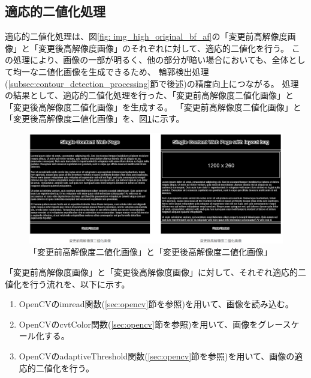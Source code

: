 \subsection{適応的二値化処理}\label{subsec:Adaptive_Binarisation}
適応的二値化処理は、図\ref{fig: img_high_original_bf_af}の「変更前高解像度画像」と「変更後高解像度画像」のそれぞれに対して、適応的二値化を行う。
この処理により、画像の一部が明るく、他の部分が暗い場合においても、全体として均一な二値化画像を生成できるため、
輪郭検出処理(\ref{subsec:contour_detection_processing}節で後述)の精度向上につながる。
処理の結果として、適応的二値化処理を行った、「変更前高解像度二値化画像」と「変更後高解像度二値化画像」を生成する。
「変更前高解像度二値化画像」と「変更後高解像度二値化画像」を、図\ref{fig: img_high_bin_bf_af}に示す。
\begin{figure}[tp]
    \begin{center}
        \includegraphics[width=1.0\columnwidth]{image/4_img_high_bin_bf_af.png}
        \caption{「変更前高解像度二値化画像」と「変更後高解像度二値化画像」}
        \label{fig: img_high_bin_bf_af}
    \end{center}
\end{figure}
\par
「変更前高解像度画像」と「変更後高解像度画像」に対して、それぞれ適応的二値化を行う流れを、以下に示す。
\begin{enumerate}
    \item OpenCVのimread関数(\ref{sec:opencv}節を参照)を用いて、画像を読み込む。
    \item OpenCVのcvtColor関数(\ref{sec:opencv}節を参照)を用いて、画像をグレースケール化する。
    \item OpenCVのadaptiveThreshold関数(\ref{sec:opencv}節を参照)を用いて、画像の適応的二値化を行う。
\end{enumerate}


